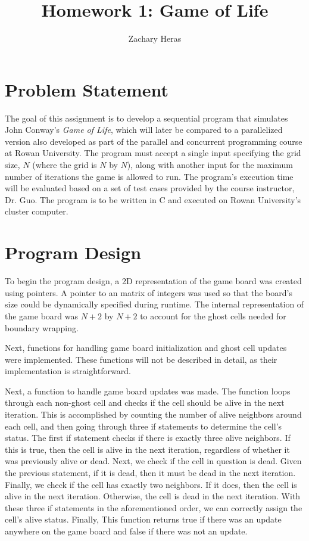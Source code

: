 \documentclass{article}
\title{Homework 1: Game of Life}
\author{Zachary Heras}
\begin{document}
	\maketitle
	
	\section{Problem Statement}
	The goal of this assignment is to develop a sequential program that simulates John Conway's \textit{Game of Life}, which will later be compared to a parallelized version also developed as part of the parallel and concurrent programming course at Rowan University. The program must accept a single input specifying the grid size, \(N\) (where the grid is \(N\) by \(N\)), along with another input for the maximum number of iterations the game is allowed to run. The program's execution time will be evaluated based on a set of test cases provided by the course instructor, Dr. Guo. The program is to be written in C and executed on Rowan University's cluster computer.

	\section{Program Design}
	To begin the program design, a 2D representation of the game board was created using pointers. A pointer to an matrix of integers was used so that the board's size could be dynamically specified during runtime. The internal representation of the game board was \(N+2\) by \(N+2\) to account for the ghost cells needed for boundary wrapping.
	
	Next, functions for handling game board initialization and ghost cell updates were implemented. These functions will not be described in detail, as their implementation is straightforward.
	
	Next, a function to handle game board updates was made. The function loops through each non-ghost cell and checks if the cell should be alive in the next iteration. This is accomplished by counting the number of alive neighbors around each cell, and then going through three if statements to determine the cell's status.
	The first if statement checks if there is exactly three alive neighbors. If this is true, then the cell is alive in the next iteration, regardless of whether it was previously alive or dead. Next, we check if the cell in question is dead. Given the previous statement, if it is dead, then it must be dead in the next iteration. Finally, we check if the cell has exactly two neighbors. If it does, then the cell is alive in the next iteration. Otherwise, the cell is dead in the next iteration. With these three if statements in the aforementioned order, we can correctly assign the cell's alive status. Finally, This function returns true if there was an update anywhere on the game board and false if there was not an update.
	
\end{document}
